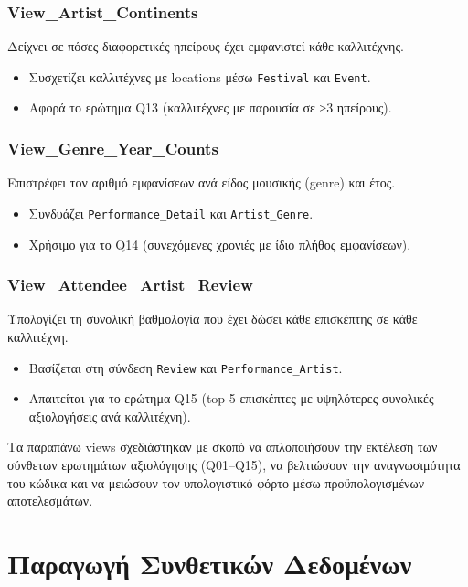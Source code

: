 \documentclass[13pt]{extarticle}
\begin{document}
\subsubsection{View\_Artist\_Continents}

Δείχνει σε πόσες διαφορετικές ηπείρους έχει εμφανιστεί κάθε καλλιτέχνης.
\begin{itemize}
    \item Συσχετίζει καλλιτέχνες με locations μέσω \texttt{Festival} και \texttt{Event}.
    \item Αφορά το ερώτημα Q13 (καλλιτέχνες με παρουσία σε ≥3 ηπείρους).
\end{itemize}

\subsubsection{View\_Genre\_Year\_Counts}

Επιστρέφει τον αριθμό εμφανίσεων ανά είδος μουσικής (genre) και έτος.
\begin{itemize}
    \item Συνδυάζει \texttt{Performance\_Detail} και \texttt{Artist\_Genre}.
    \item Χρήσιμο για το Q14 (συνεχόμενες χρονιές με ίδιο πλήθος εμφανίσεων).
\end{itemize}

\subsubsection{View\_Attendee\_Artist\_Review}

Υπολογίζει τη συνολική βαθμολογία που έχει δώσει κάθε επισκέπτης σε κάθε καλλιτέχνη.
\begin{itemize}
    \item Βασίζεται στη σύνδεση \texttt{Review} και \texttt{Performance\_Artist}.
    \item Απαιτείται για το ερώτημα Q15 (top-5 επισκέπτες με υψηλότερες συνολικές αξιολογήσεις ανά καλλιτέχνη).
\end{itemize}

\vspace{0.5cm}
Τα παραπάνω views σχεδιάστηκαν με σκοπό να απλοποιήσουν την εκτέλεση των σύνθετων ερωτημάτων αξιολόγησης (Q01–Q15), να βελτιώσουν την αναγνωσιμότητα του κώδικα και να μειώσουν τον υπολογιστικό φόρτο μέσω προϋπολογισμένων αποτελεσμάτων.

\clearpage
\section{Παραγωγή Συνθετικών Δεδομένων}
\end{document}
